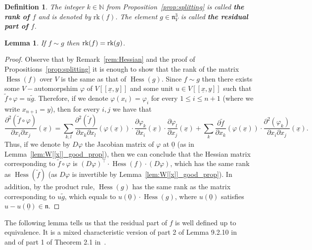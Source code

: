\documentclass{article}
\newtheorem{definition}[theorem]{Definition}
\newtheorem{lemma}[theorem]{Lemma}
\DeclareMathOperator{\Hess}{Hess}
\newcommand{\naxV}{\mathfrak{n}_V}
\numberwithin{theorem}{section}
\begin{document}
\begin{definition}
    The integer $k \in \mathbb{N}$ from Proposition~\ref{prop:splitting}  is called \textbf{the rank of $f$} and is denoted by $\text{rk}\left(f\right)$. The element $g \in \naxV^3$ is called \textbf{the residual part of $f$}. 
\end{definition}


\begin{lemma}
    If $f \sim g$ then $\textup{rk}(f) = \textup{rk}(g)$. 
\end{lemma}

\begin{proof}
    Observe that by Remark~\ref{rem:Hessian} and the proof of Propositions~\ref{prop:splitting} it is enough to show that the rank of the matrix $ \Hess(f)$ over $V$ is the same as that of $ \Hess(g)$. Since $f \sim g$ then there exists some $V-$automorpshim $\varphi$ of $V[[\underline{x},y]]$ and some unit $u \in V[[\underline{x},y]]$ such that $\tilde{f}\circ \varphi= u \tilde{g}$. Therefore, if we denote $\varphi(x_i)=\varphi_i$ for every $1 \leq i\leq n+1$ (where we write $x_{n+1}=y$), then for every $i,j$ we have that 
    \begin{equation*}
        \frac{\partial^2(\tilde{f} \circ \varphi)}{\partial x_i \partial x_j} (\underline{x}) = \sum_{k,l} \frac{\partial^2(\tilde{f})}{\partial x_k \partial x_l}(\varphi(\underline{x})) \cdot \frac{\partial \varphi_k}{\partial x_i}(\underline{x}) \cdot \frac{\partial \varphi_l}{\partial x_j}(\underline{x}) + \sum_k \frac{\partial \tilde{f}}{\partial x_k}(\varphi(\underline{x})) \cdot \frac{\partial^2(\varphi_k)}{\partial x_i \partial x_j} (\underline{x}).
    \end{equation*}
    Thus, if we denote by $D\varphi$ the Jacobian matrix of $\varphi$ at $\underline{0}$ (as in Lemma~\ref{lem:W[[x]]_good_prop}), then we can conclude that the Hessian matrix corresponding to $\tilde{f} \circ \varphi$ is $(D\varphi)^\intercal \cdot  \Hess(f) \cdot (D\varphi)$, which has the same rank as $ \Hess(\tilde{f})$ (as $D\varphi$ is invertible by Lemma~\ref{lem:W[[x]]_good_prop}). In addition, by the product rule, $ \Hess(g)$  has the same rank as the matrix corresponding to $u \tilde{g}$, which equals to $u(\underline{0}) \cdot  \Hess(g)$, where $u(\underline{0})$ satisfies $u - u(\underline{0}) \in \mathfrak{n}$. 
\end{proof}

The following lemma tells us that the residual part of $f$ is well defined up to equivalence. It is a mixed characteristic version of part 2 of Lemma 9.2.10 in~\cite{de2013local} and of part 1 of Theorem 2.1 in~\cite{greuel2025splitting}. 
\end{document}
